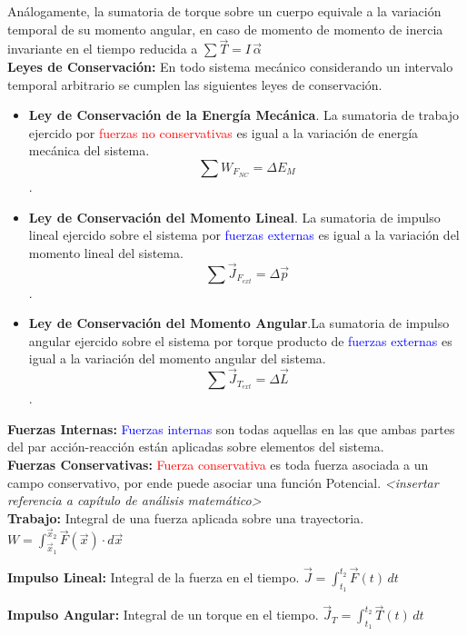 \documentclass[12pt,a4paper]{article}
\begin{document}
Análogamente, la sumatoria de torque sobre un cuerpo equivale a la variación temporal de su momento angular, en caso de momento de momento de inercia invariante en el tiempo reducida a $\sum {\vec{T}} = I \, \vec{\alpha}$\\



\textbf{Leyes de Conservación:} En todo sistema mecánico considerando un intervalo temporal arbitrario se cumplen las siguientes leyes de conservación.
\begin{itemize}
	\item \textbf{Ley de Conservación de la Energía Mecánica}. La sumatoria de trabajo ejercido por \textcolor{red}{fuerzas no conservativas} es igual a la variación de energía mecánica del sistema. $$\sum{W_{F_{NC}}} = \Delta E_M$$.
	\item \textbf{Ley de Conservación del Momento Lineal}. La sumatoria de impulso lineal ejercido sobre el sistema por \textcolor{blue}{fuerzas externas} es igual a la variación del momento lineal del sistema. $$\sum{\vec{J}_{F_{ext}}} = \Delta \vec{p}$$.
	\item \textbf{Ley de Conservación del Momento Angular}.La sumatoria de impulso angular ejercido sobre el sistema por torque producto de \textcolor{blue}{fuerzas externas} es igual a la variación del momento angular del sistema.
	$$\sum{\vec{J}_{T_{ext}}} = \Delta \vec{L}$$.
\end{itemize}

\textbf{Fuerzas Internas:} \textcolor{blue}{Fuerzas internas} son todas aquellas en las que ambas partes del par acción-reacción están aplicadas sobre elementos del sistema.\\

\textbf{Fuerzas Conservativas:} \textcolor{red}{Fuerza conservativa} es toda fuerza asociada a un campo conservativo, por ende puede asociar una función Potencial. \textit{<insertar referencia a capítulo de análisis matemático>}\\

\textbf{Trabajo:} Integral de una fuerza aplicada sobre una trayectoria. $\displaystyle W=\int_{\vec{x}_1}^{\vec{x}_2}\vec{F}(\vec{x})\cdot d\vec{x}$

\textbf{Impulso Lineal:} Integral de la fuerza en el tiempo. $\displaystyle \vec{J}=\int_{t_1}^{t_2}\vec{F}(t)\, dt$

\textbf{Impulso Angular:} Integral de un torque en el tiempo. $\displaystyle  \vec{J}_T=\int_{t_1}^{t_2}\vec{T}(t)\, dt$ \\
\end{document}

